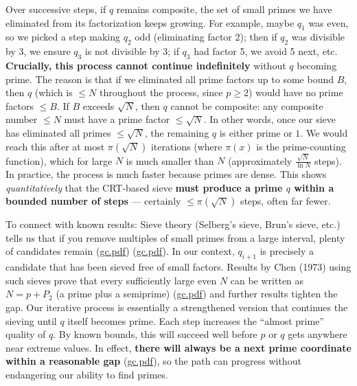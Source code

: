 \documentclass[12pt]{article}
\begin{document}
\begin{enumerate}[leftmargin=*, label=\arabic*.]
  Over successive steps, if $q$ remains composite, the set of small primes we have eliminated from its factorization keeps growing. For example, maybe $q_1$ was even, so we picked a step making $q_2$ odd (eliminating factor 2); then if $q_2$ was divisible by 3, we ensure $q_3$ is not divisible by 3; if $q_3$ had factor 5, we avoid 5 next, etc. \textbf{Crucially, this process cannot continue indefinitely} without $q$ becoming prime. The reason is that if we eliminated all prime factors up to some bound $B$, then $q$ (which is $\le N$ throughout the process, since $p \ge 2$) would have no prime factors $\le B$. If $B$ exceeds $\sqrt{N}$, then $q$ cannot be composite: any composite number $\le N$ must have a prime factor $\le \sqrt{N}$. In other words, once our sieve has eliminated all primes $\le \sqrt{N}$, the remaining $q$ is either prime or $1$. We would reach this after at most $\pi(\sqrt{N})$ iterations (where $\pi(x)$ is the prime-counting function), which for large $N$ is much smaller than $N$ (approximately $\frac{\sqrt{N}}{\ln N}$ steps). In practice, the process is much faster because primes are dense. This shows \emph{quantitatively} that the CRT-based sieve \textbf{must produce a prime $q$ within a bounded number of steps} --- certainly $\le \pi(\sqrt{N})$ steps, often far fewer.

  To connect with known results: Sieve theory (Selberg’s sieve, Brun’s sieve, etc.) tells us that if you remove multiples of small primes from a large interval, plenty of candidates remain (\href{file://file-7ZYYwSHWVa83XEVTrEhg5z#:~:text=Theorem,i%2B1%7D%3Dp_i}{gc.pdf}) (\href{file://file-7ZYYwSHWVa83XEVTrEhg5z#:~:text=many%20candidates%20uneliminated%20,CRT%29%20to%20choose}{gc.pdf}). In our context, $q_{i+1}$ is precisely a candidate that has been sieved free of small factors. Results by Chen (1973) using such sieves prove that every sufficiently large even $N$ can be written as $N = p + P_2$ (a prime plus a semiprime) (\href{file://file-7ZYYwSHWVa83XEVTrEhg5z#:~:text=https%3A%2F%2Fen.wikipedia.org%2Fwiki%2FGoldbach,20Chinese%2C1}{gc.pdf}) and further results tighten the gap. Our iterative process is essentially a strengthened version that continues the sieving until $q$ itself becomes prime. Each step increases the “almost prime” quality of $q$. By known bounds, this will succeed well before $p$ or $q$ gets anywhere near extreme values. In effect, \textbf{there will always be a next prime coordinate within a reasonable gap} (\href{file://file-7ZYYwSHWVa83XEVTrEhg5z#:~:text=the%20prime%20factors%20that%20made,always%20be%20a%20next%20prime}{gc.pdf}), so the path can progress without endangering our ability to find primes.


\end{enumerate}
\end{document}
